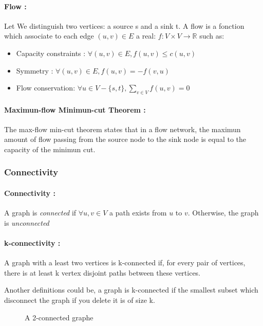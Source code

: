 \paragraph{Flow :}
Let We distinguish two vertices: a source s and a sink t.
A flow is a fonction which associate to each edge $(u,v) \in E$ a real: $f: V \times V \rightarrow \mathbb{R}$ such as:
\begin{itemize}
    \item Capacity constraints : $\forall (u,v) \in E, f(u,v) \leq c(u,v)$
    \item Symmetry : $\forall (u,v) \in E, f(u,v) = - f(v,u) $
    \item Flow conservation: $\forall u \in V - \{s,t\}, \sum_{v \in V}f(u,v) = 0$ 
\end{itemize}


\paragraph{Maximun-flow Minimun-cut Theorem :}
The max-flow min-cut theorem states that in a flow network, the maximun amount of flow passing from the source node to the sink node is equal to the capacity of the minimun cut.


\subsubsection{Connectivity}
\paragraph{Connectivity :}\label{defConnectivity}
A graph  is {\em connected} if $\forall u,v \in V$ a path exists from $u$
to $v$. Otherwise, the graph is {\em unconnected}

\paragraph{k-connectivity :}
A graph with a least two vertices is k-connected if, for every pair of vertices, there is at least k vertex disjoint paths between these vertices.

Another definitions could be, a graph is k-connected if the smallest subset which disconnect the graph if you delete it is of size k.

\begin{figure}[!h]
  \begin{center}
    
  \end{center}
  \caption{A 2-connected graphe}
\end{figure}

